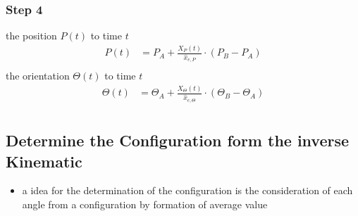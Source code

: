 \documentclass[%
  professionalfonts,%
  xcolor={%
    usenames,%
    dvipsnames,%
    svgnames,%
    table,%
    hyperref%
  }%
]{beamer}
\begin{document}
\subsubsection{Step 4}
\begin{frame}
the position $P(t)$ to time $t$
\begin{align*}
P(t) & = P_{A} + \frac{X_{P}(t)}{\hat{x}_{e,P}} \cdot \left(P_{B} - P_{A} \right)\\
\end{align*}
the orientation $\Theta(t)$ to time $t$
\begin{align*}
\Theta(t) & = \Theta_{A} + \frac{X_{\Theta}(t)}{\hat{x}_{e,\Theta}} \cdot \left(\Theta_{B} - \Theta_{A} \right)\\
\end{align*}
\end{frame}


\subsection{Determine the Configuration form the inverse Kinematic}

%

\begin{frame}
\begin{itemize}
  \item a idea for the determination of the configuration is the consideration of each angle from a configuration by formation of average value
\end{itemize}


\end{frame}
\end{document}
